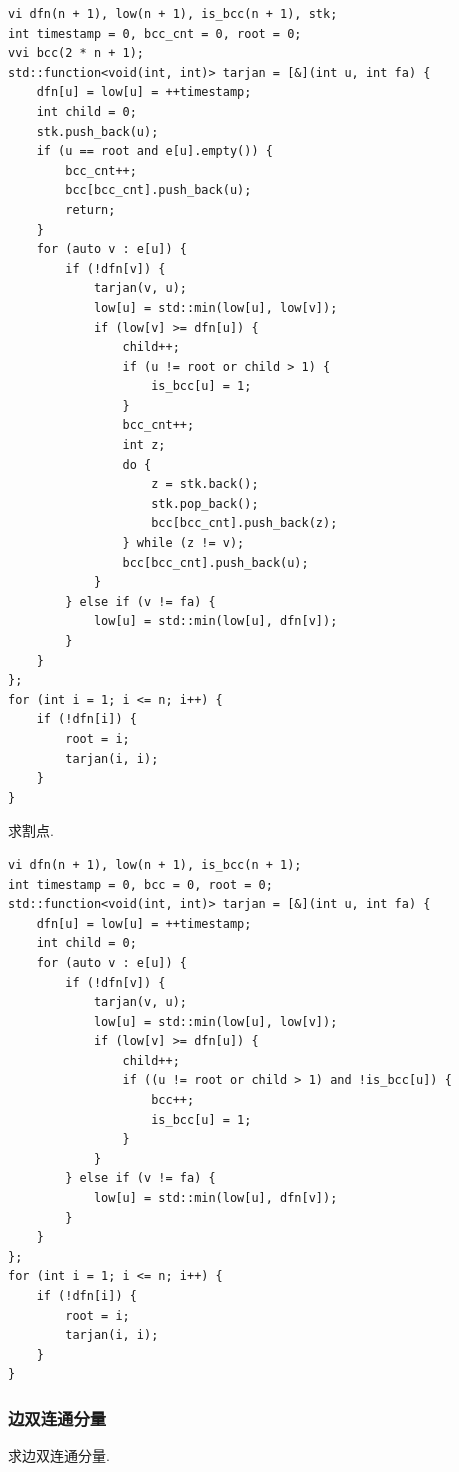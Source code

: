 \documentclass[UTF8, a4paper, titlepage, twoside]{ctexart}
\begin{document}
\begin{lstlisting}[style=cpp]
vi dfn(n + 1), low(n + 1), is_bcc(n + 1), stk;
int timestamp = 0, bcc_cnt = 0, root = 0;
vvi bcc(2 * n + 1);
std::function<void(int, int)> tarjan = [&](int u, int fa) {
    dfn[u] = low[u] = ++timestamp;
    int child = 0;
    stk.push_back(u);
    if (u == root and e[u].empty()) {
        bcc_cnt++;
        bcc[bcc_cnt].push_back(u);
        return;
    }
    for (auto v : e[u]) {
        if (!dfn[v]) {
            tarjan(v, u);
            low[u] = std::min(low[u], low[v]);
            if (low[v] >= dfn[u]) {
                child++;
                if (u != root or child > 1) {
                    is_bcc[u] = 1;
                }
                bcc_cnt++;
                int z;
                do {
                    z = stk.back();
                    stk.pop_back();
                    bcc[bcc_cnt].push_back(z);
                } while (z != v);
                bcc[bcc_cnt].push_back(u);
            }
        } else if (v != fa) {
            low[u] = std::min(low[u], dfn[v]);
        }
    }
};
for (int i = 1; i <= n; i++) {
    if (!dfn[i]) {
        root = i;
        tarjan(i, i);
    }
}
\end{lstlisting}

求割点.

\begin{lstlisting}[style=cpp]
vi dfn(n + 1), low(n + 1), is_bcc(n + 1);
int timestamp = 0, bcc = 0, root = 0;
std::function<void(int, int)> tarjan = [&](int u, int fa) {
    dfn[u] = low[u] = ++timestamp;
    int child = 0;
    for (auto v : e[u]) {
        if (!dfn[v]) {
            tarjan(v, u);
            low[u] = std::min(low[u], low[v]);
            if (low[v] >= dfn[u]) {
                child++;
                if ((u != root or child > 1) and !is_bcc[u]) {
                    bcc++;
                    is_bcc[u] = 1;
                }
            }
        } else if (v != fa) {
            low[u] = std::min(low[u], dfn[v]);
        }
    }
};
for (int i = 1; i <= n; i++) {
    if (!dfn[i]) {
        root = i;
        tarjan(i, i);
    }
}
\end{lstlisting}

\subsubsection*{ 边双连通分量 }
求边双连通分量.
\end{document}
